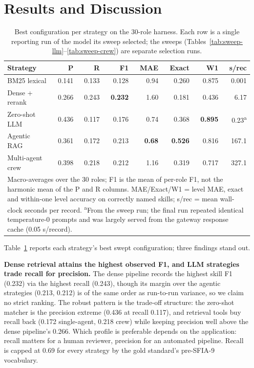 \documentclass[conference]{IEEEtran}
\begin{document}
\section{Results and Discussion}\label{sec:results}

\begin{table}
\centering
\caption{Best configuration per strategy on the 30-role harness. Each row is a single reporting run of the model its sweep selected; the sweeps (Tables~\ref{tab:sweep-llm}--\ref{tab:sweep-crew}) are separate selection runs.}
\label{tab:main-results}
\footnotesize
\setlength{\tabcolsep}{3.5pt}
\begin{tabularx}{\linewidth}{Xrrrrrrr}
\toprule
\textbf{Strategy} & \textbf{P} & \textbf{R} & \textbf{F1} & \textbf{MAE} & \textbf{Exact} & \textbf{W1} & \textbf{s/rec}\\
\midrule
BM25 lexical & 0.141 & 0.133 & 0.128 & 0.94 & 0.260 & 0.875 & 0.001\\
Dense + rerank & 0.266 & 0.243 & \textbf{0.232} & 1.60 & 0.181 & 0.436 & 6.17\\
Zero-shot LLM & 0.436 & 0.117 & 0.176 & 0.74 & 0.368 & \textbf{0.895} & 0.23\textsuperscript{a}\\
Agentic RAG & 0.361 & 0.172 & 0.213 & \textbf{0.68} & \textbf{0.526} & 0.816 & 167.1\\
Multi-agent crew & 0.398 & 0.218 & 0.212 & 1.16 & 0.319 & 0.717 & 327.1\\
\bottomrule
\multicolumn{8}{p{0.95\linewidth}}{\footnotesize Macro-averages over the 30 roles; F1 is the mean of per-role F1, not the harmonic mean of the P and R columns. MAE/Exact/W1 = level MAE, exact and within-one level accuracy on correctly named skills; s/rec = mean wall-clock seconds per record. \textsuperscript{a}From the sweep run; the final run repeated identical temperature-0 prompts and was largely served from the gateway response cache (0.05 s/record).}\\
\end{tabularx}
\end{table}

Table~\ref{tab:main-results} reports each strategy's best swept configuration; three findings stand out.

\textbf{Dense retrieval attains the highest observed F1, and LLM strategies trade recall for precision.} The dense pipeline records the highest skill F1 (0.232) via the highest recall (0.243), though its margin over the agentic strategies (0.213, 0.212) is of the same order as run-to-run variance, so we claim no strict ranking. The robust pattern is the trade-off structure: the zero-shot matcher is the precision extreme (0.436 at recall 0.117), and retrieval tools buy recall back (0.172 single-agent, 0.218 crew) while keeping precision well above the dense pipeline's 0.266. Which profile is preferable depends on the application: recall matters for a human reviewer, precision for an automated pipeline. Recall is capped at 0.69 for every strategy by the gold standard's pre-SFIA-9 vocabulary.
\end{document}
